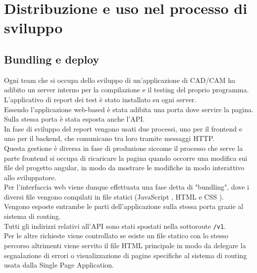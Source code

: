 \chapter{Distribuzione e uso nel processo di sviluppo}

    \section{Bundling e deploy}
        Ogni team che si occupa dello sviluppo di un'applicazione di CAD/CAM ha adibito un server interno per la compilazione e il testing del proprio programma.\\
        L'applicativo di report dei test è stato installato su ogni server.\\

        Essendo l'applicazione web-based è stata adibita una porta dove servire la pagina.\\
        Sulla stessa porta è stata esposta anche l'API.\\

        In fase di sviluppo del report vengono usati due processi, uno per il frontend e uno per il backend, che comunicano tra loro tramite messaggi HTTP.\\
        Questa gestione è diversa in fase di produzione siccome il processo che serve la parte frontend si occupa di ricaricare la pagina quando occorre una modifica sui file del progetto angular, in modo da mostrare le modifiche in modo interattivo allo sviluppatore.\\
        Per l'interfaccia web viene dunque effettuata una fase detta di "bundling", dove i diversi file  vengono compilati in file statici (JavaScript \cite{JS}, HTML \cite{HTML} e CSS \cite{CSS}).\\
        Vengono esposte entrambe le parti dell'applicazione sulla stessa porta grazie al sistema di routing.\\
        Tutti gli indirizzi relativi all'API sono stati spostati nella sottoroute \verb|/v1|.\\
        Per le altre richieste viene controllato se esiste un file statico con lo stesso percorso altrimenti viene servito il file HTML principale in modo da delegare la segnalazione di errori o visualizzazione di pagine specifiche al sistema di routing usata dalla Single Page Application.\\

